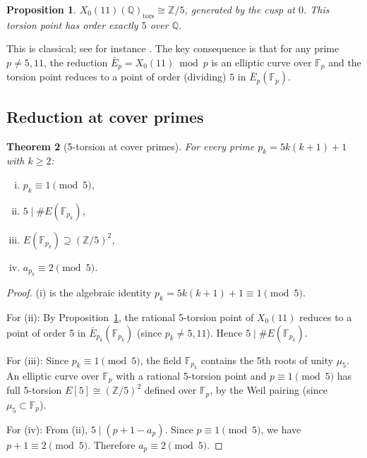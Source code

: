 \documentclass[11pt,a4paper]{article}
\newtheorem{theorem}{Theorem}[section]
\newtheorem{proposition}[theorem]{Proposition}
\theoremstyle{definition}
\newcommand{\ZZ}{\mathbb{Z}}
\newcommand{\QQ}{\mathbb{Q}}
\newcommand{\FF}{\mathbb{F}}
\newcommand{\pk}{p_k}
\newcommand{\Xo}{X_0(11)}
\newcommand{\Ek}{E(\FF_{\pk})}
\begin{document}
\begin{proposition}
\label{prop:torsion}
$\Xo(\QQ)_{\mathrm{tors}} \cong \ZZ/5$,
generated by the cusp at $0$.
This torsion point has order exactly $5$ over $\QQ$.
\end{proposition}

This is classical; see for instance \cite[Example~8.1]{SilvermanAEC}.
The key consequence is that for any prime $p \neq 5, 11$,
the reduction $\bar{E}_p = \Xo \bmod p$ is an elliptic curve
over $\FF_p$ and the torsion point reduces to a point of order
(dividing) $5$ in $\bar{E}_p(\FF_p)$.

\subsection{Reduction at cover primes}

\begin{theorem}[5-torsion at cover primes]
\label{thm:torsion}
For every prime $\pk = 5k(k+1)+1$ with $k \geq 2$:
\begin{enumerate}[(i)]
\item $\pk \equiv 1 \pmod{5}$,
\item $5 \mid \#\Ek$,
\item $\Ek \supseteq (\ZZ/5)^2$,
\item $a_{\pk} \equiv 2 \pmod{5}$.
\end{enumerate}
\end{theorem}

\begin{proof}
(i) is the algebraic identity $\pk = 5k(k+1)+1 \equiv 1 \pmod{5}$.

For (ii): By Proposition~\ref{prop:torsion}, the rational 5-torsion
point of $\Xo$ reduces to a point of order 5 in $\bar{E}_{\pk}(\FF_{\pk})$
(since $\pk \neq 5, 11$). Hence $5 \mid \#\Ek$.

For (iii): Since $\pk \equiv 1 \pmod{5}$, the field $\FF_{\pk}$
contains the 5th roots of unity $\mu_5$.
An elliptic curve over $\FF_p$ with a rational 5-torsion point
and $p \equiv 1 \pmod{5}$ has full 5-torsion $E[5] \cong (\ZZ/5)^2$
defined over $\FF_p$, by the Weil pairing
(since $\mu_5 \subset \FF_p$).

For (iv): From (ii), $5 \mid (p+1-a_p)$.
Since $p \equiv 1 \pmod{5}$, we have $p+1 \equiv 2 \pmod{5}$.
Therefore $a_p \equiv 2 \pmod{5}$.
\end{proof}
\end{document}
